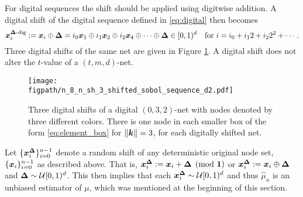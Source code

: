 \documentclass{svproc}
\newcommand{\figpath}{Figures}
\begin{document}
For digital sequences the shift should be applied using digitwise addition.  A digital shift of the digital sequence defined in  \eqref{eq:digital} then becomes
\begin{equation} \label{eq:sh_digital}
	{\boldsymbol{x}}_i^{{\boldsymbol{\Delta}}\text{-dig}} := {\boldsymbol{x}}_i \oplus {\boldsymbol{\Delta}} = i_0 {\boldsymbol{x}}_1 \oplus i_1 {\boldsymbol{x}}_2 \oplus i_2 {\boldsymbol{x}}_4 \oplus \cdots \oplus {\boldsymbol{\Delta}} \in [0,1)^d \quad \text{for }
	i = i_0 + i_12 + i_2 2^2 + \cdots.
\end{equation}
Three digital shifts of the same net are given in Figure \ref{fig:shift_net}.  A digital shift does not alter the $t$-value of a $(t,m,d)$-net.

\begin{figure}
	\centering
	\texttt{[image: \\figpath/n\_8\_n\_sh\_3\_shifted\_sobol\_sequence\_d2.pdf]}
	\caption{Three digital shifts of a digital $(0,3,2)$-net with nodes denoted by three different colors.  There is one node in each smaller box of the form \eqref{eq:element_box} for $\lVert {\boldsymbol{k}} \rVert = 3$, for each digitally shifted net. \label{fig:shift_net}}
\end{figure}

Let $\{{\boldsymbol{x}}_i^{{\boldsymbol{\Delta}}}\}_{i=0}^{n-1}$ denote a random shift of any deterministic original node set, $\{{\boldsymbol{x}}_i \}_{i=0}^{n-1}$ as described above.  That is, ${\boldsymbol{x}}_i^{{\boldsymbol{\Delta}}} : = {\boldsymbol{x}}_i + {\boldsymbol{\Delta}} \pmod {{\boldsymbol{1}}}$ or  ${\boldsymbol{x}}_i^{{\boldsymbol{\Delta}}} : = {\boldsymbol{x}}_i \oplus {\boldsymbol{\Delta}}$ and ${\boldsymbol{\Delta}} \sim {\mathcal{U}}[0,1)^d$. This then implies that each ${\boldsymbol{x}}_i^{{\boldsymbol{\Delta}}} \sim {\mathcal{U}}[0,1)^d$ and thus $\hat{\mu}_n$ is an unbiased estimator of $\mu$, which was mentioned at the beginning of this section.
\end{document}
